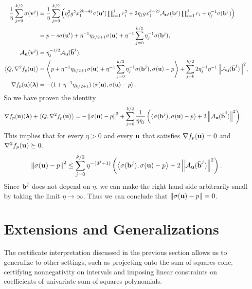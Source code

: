 \documentclass[final,onefignum,onetabnum]{siamart220329}
\begin{document}
\begin{align*}
  \frac{1}{\eta}\sum_{j=0}^{k/2}\sigma(\boldsymbol{\mathbf{v}}^j)
  &= \frac{1}{\eta}\sum_{j=0}^{k/2} \left(  \textstyle
    \eta_j^3 g^2 x_1^{2k-4j} \sigma(\boldsymbol{\mathbf{u'}}) \prod_{i=1}^j r_i^2
    + 2\eta_j g x_1^{k-2j}  \mathcal{A}_{\boldsymbol{\mathbf{u}}'}(\boldsymbol{\mathbf{b}}^j) \prod_{i=1}^j r_i
    + \eta_j^{-1} \sigma(\boldsymbol{\mathbf{b}}^j) \right) \\
  &= p - s\sigma(\boldsymbol{\mathbf{u'}}) + \eta^{-1}\eta_{k/2+1}\sigma(\boldsymbol{\mathbf{u}})
    + \eta^{-1}\sum_{j=0}^{k/2} \eta_j^{-1}\sigma(\boldsymbol{\mathbf{b}}^j), \\
  \mathcal{A}_{\boldsymbol{\mathbf{u}}}(\boldsymbol{\mathbf{v}}^j)
  &= \eta_j^{-1/2} \mathcal{A}_{\boldsymbol{\mathbf{u}}}(\boldsymbol{\mathbf{\bar{b}}}^j),\\
  \left\langle Q, \nabla^2 f_p(\boldsymbol{\mathbf{u}}) \right\rangle
  &= \left\langle p + \eta^{-1}\eta_{k/2+1}\sigma(\boldsymbol{\mathbf{u}})
    + \eta^{-1}\sum_{j=0}^{k/2} \eta_j^{-1}\sigma(\boldsymbol{\mathbf{b}}^j), \sigma(\boldsymbol{\mathbf{u}}) - p \right\rangle
    + \sum_{j=0}^{k/2}2\eta_j^{-1} \eta^{-1} \left\lVert \mathcal{A}_{\boldsymbol{\mathbf{u}}}(\boldsymbol{\mathbf{\bar{b}}}^j) \right\lVert^2, \\
  \nabla f_p(\boldsymbol{\mathbf{u}})(\boldsymbol{\mathbf{\lambda}}) &= -(1 + \eta^{-1}\eta_{k/2+1})\left\langle \sigma(\boldsymbol{\mathbf{u}}) , \sigma(\boldsymbol{\mathbf{u}}) - p \right\rangle.
\end{align*}
So we have proven the identity
\begin{align} \label{eq:cert-general}
  \nabla f_p(\boldsymbol{\mathbf{u}})(\boldsymbol{\mathbf{\lambda}}) + \left\langle Q, \nabla^2 f_p(\boldsymbol{\mathbf{u}}) \right\rangle
  & =
    -\left\lVert \sigma(\boldsymbol{\mathbf{u}}) - p \right\lVert^2  +
    \sum_{j=0}^{k/2} \frac{1}{\eta \eta_j}
    \left( \left\langle \sigma(\boldsymbol{\mathbf{b}}^j), \sigma(\boldsymbol{\mathbf{u}}) - p \right\rangle + 2\left\lVert \mathcal{A}_{\boldsymbol{\mathbf{u}}}(\boldsymbol{\mathbf{\bar{b}}}^j) \right\lVert^2 \right).
\end{align}
This implies that for every $\eta > 0$ and every $\boldsymbol{\mathbf{u}}$ that satisfies
$\nabla f_p(\boldsymbol{\mathbf{u}}) = 0$ and $\nabla^2 f_p(\boldsymbol{\mathbf{u}}) \succeq 0$,
\begin{align*}
  \left\lVert \sigma(\boldsymbol{\mathbf{u}}) - p \right\lVert^2 \le
    \sum_{j=0}^{k/2} \eta^{-(3^j+1)}
    \left( \left\langle \sigma(\boldsymbol{\mathbf{b}}^j), \sigma(\boldsymbol{\mathbf{u}}) - p \right\rangle + 2\left\lVert \mathcal{A}_{\boldsymbol{\mathbf{u}}}(\boldsymbol{\mathbf{\bar{b}}}^j) \right\lVert^2 \right).
\end{align*}
Since $\boldsymbol{\mathbf{b}}^j$ does not depend on $\eta$, we can make the right hand side
arbitrarily small by taking the limit $\eta \to \infty$. Thus we can conclude
that $\left\lVert \sigma(\boldsymbol{\mathbf{u}}) - p \right\lVert = 0$.

\section{Extensions and Generalizations}
\label{sec:extensions}
The certificate interpretation discussed in the previous section allows us to
generalize  to other settings, such as projecting onto the sum of
squares cone, certifying nonnegativity on intervals and imposing linear
constraints on coefficients of univariate sum of squares polynomials.
\end{document}
